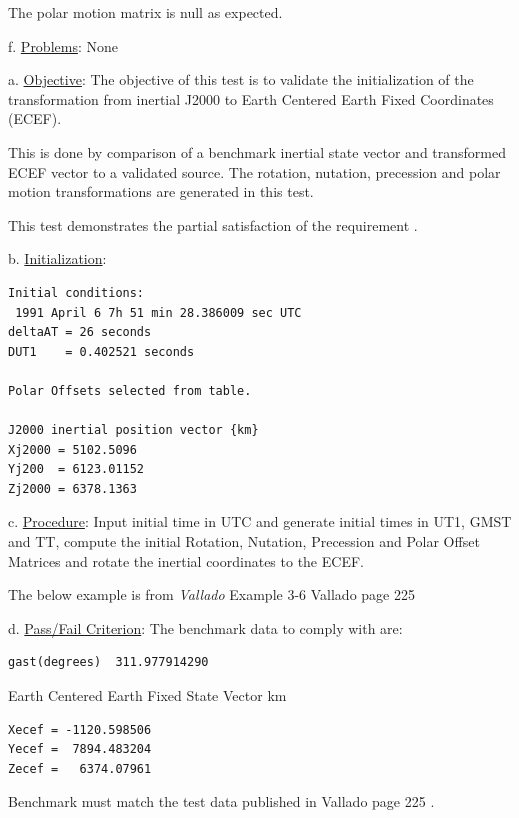 The polar motion matrix is null as expected.\newline

f. \underline{Problems}:\newline
None\newline


      \label{test:rnp_test5}

a. \underline{Objective}:\newline
The objective of this test is to validate the initialization 
of the transformation from inertial J2000 to Earth Centered Earth Fixed 
Coordinates (ECEF).

This is done by comparison of a benchmark inertial state vector 
and transformed ECEF vector to a validated source.  
The rotation, nutation, precession and polar 
motion transformations are generated in this test.

This test demonstrates the partial satisfaction
of the requirement .
\newline

b. \underline{Initialization}:
\begin{verbatim}
Initial conditions:
 1991 April 6 7h 51 min 28.386009 sec UTC
deltaAT = 26 seconds
DUT1    = 0.402521 seconds

Polar Offsets selected from table.

J2000 inertial position vector {km}
Xj2000 = 5102.5096
Yj200  = 6123.01152 
Zj2000 = 6378.1363
\end{verbatim}

c. \underline{Procedure}:\newline
Input initial time in UTC and generate initial times in UT1, 
GMST and TT, compute the 
initial Rotation, Nutation, Precession and Polar Offset Matrices 
and rotate the inertial coordinates to the ECEF.

The below example is from  {\em Vallado} \cite{VMcC}
Example 3-6 Vallado page 225\newline

d. \underline{Pass/Fail Criterion}:\newline
The benchmark data to comply with are:
\begin{verbatim}
gast(degrees)  311.977914290
\end{verbatim}

Earth Centered Earth Fixed State Vector {km}
\begin{verbatim}
Xecef = -1120.598506 
Yecef =  7894.483204 
Zecef =   6374.07961
\end{verbatim}
Benchmark must match the test data published in Vallado page 225 \cite{VMcC}.

